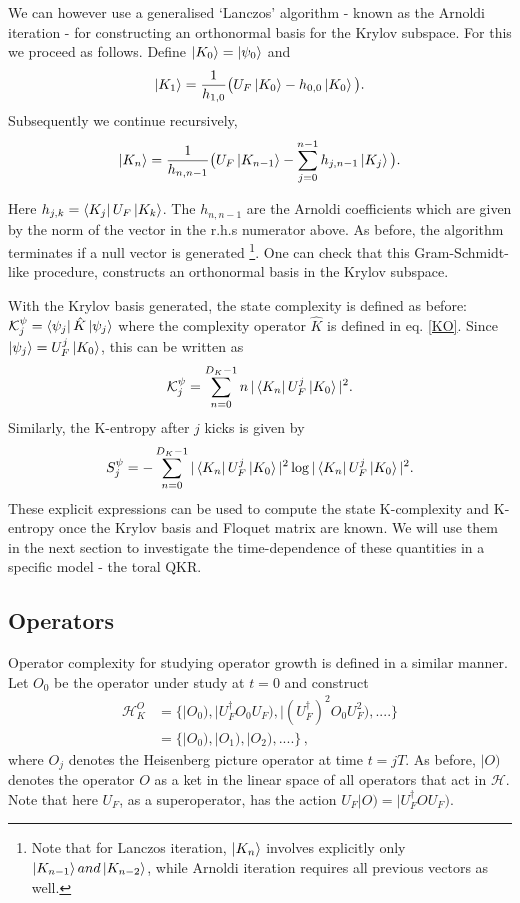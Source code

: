 \documentclass[a4paper,12pt]{article}
\begin{document}
We can however use a generalised `Lanczos' algorithm - known as the Arnoldi iteration - for constructing an orthonormal basis for the Krylov subspace. For this we proceed as follows. Define $\ket{K_0}=\ket{\psi_0}$ and
\begin{align} 
\ket{K_1}=\frac{1}{h_{1,0}}\big( U_F \ket{K_0}-h_{0,0}\ket{K_0} \big).
\end{align} 
Subsequently we continue recursively,
\begin{align}
\ket{K_n}=\frac{1}{h_{n,n-1}}\big( U_F \ket{K_{n-1}}-\sum_{j=0}^ {n-1}h_{j,n-1}\ket{K_j} \big).
\end{align} 

Here $h_{j,k}=\bra{K_j}{U_F}\ket{K_k}$. The $h_{n,n-1}$ are the Arnoldi coefficients which are given by the norm of the vector in the r.h.s numerator above. As before, the algorithm terminates if a null vector is generated \footnote{Note that for Lanczos iteration, $\ket{K_n}$ involves explicitly only $\ket{K_{n-1}} and \ket{K_{n-2}}$, while Arnoldi iteration requires all previous vectors as well.}. One can check that this Gram-Schmidt-like procedure, constructs an orthonormal basis in the Krylov subspace.

With the Krylov basis generated, the state complexity is defined as before: $\mathcal{K}_j^{\psi}=\bra{\psi_j}{\hat{K}}\ket{\psi_j}$ where the complexity operator $\hat{K}$ is defined in eq. \eqref{KO}. Since $\ket{\psi_j}=U_F^j\ket{K_0}$, this can be written as
\begin{align}   
\mathcal{K}_j^{\psi}=\sum_{n=0}^{D_K-1} n \, |\bra{K_n}{U_F^ j}\ket{K_0}|^2.
\end{align}
Similarly, the K-entropy after $j$ kicks is given by
\begin{align}
S_j^{\psi}=- \sum_{n=0}^{D_K-1} |\bra{K_n}{U_F^ j}\ket{K_0}|^2 \log |\bra{K_n}{U_F^ j}\ket{K_0}|^2.
\end{align}
These explicit expressions can be used to compute the state K-complexity and K-entropy once the Krylov basis and Floquet matrix are known. We will use them in the next section to investigate the time-dependence of these quantities in a specific model - the toral QKR.

\subsection{Operators}
  Operator complexity for studying operator growth is defined in a similar manner. Let $O_0$ be the operator under study at $t=0$ and construct
  \begin{align}   
  \mathcal{H}_K^O&= \{|O_0), |U_F^{\dagger}O_0 U_F),   |(U_F^{\dagger})^ 2 O_0 U_F^ 2),....\} \nonumber\\
  &=\{|O_0), |O_1), |O_2), .... \}\, ,
  \end{align} 
where $O_j$ denotes the Heisenberg picture operator at time $t=jT$. As before, $|O)$ denotes the operator $O$ as a ket in the linear space of all operators that act in $\mathcal{H}$. Note that here $U_F$, as a superoperator, has the action $U_F|O)=|U_F^ {\dagger} O U_F)$.
\end{document}
